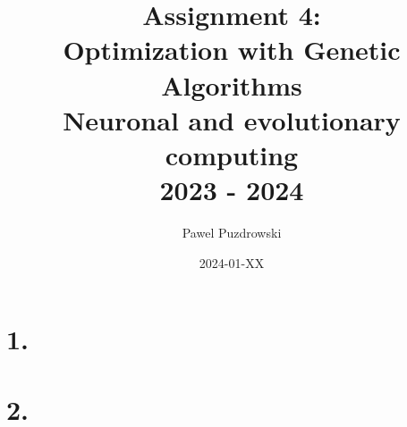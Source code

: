 \documentclass[12pt]{report}
\title{Assignment 4: \\ Optimization with Genetic Algorithms \\ Neuronal and evolutionary computing\\ 2023 - 2024}
\author{Pawel Puzdrowski}
\date{2024-01-XX}
\begin{document}
    \maketitle
    \tableofcontents
    \newpage
    \section{1.}
    \section{2.}
    
     
	 
\end{document}
